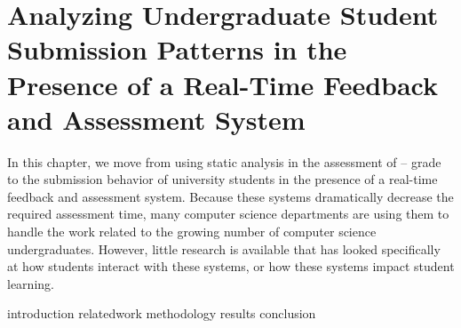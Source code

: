 \chapter{Analyzing Undergraduate Student Submission Patterns in the Presence of
  a Real-Time Feedback and Assessment System}
\label{chap:feedback}

\def\currentprefix{feedback}

In this chapter, we move from using static analysis in the assessment of
-- grade  to the submission behavior of university
students in the presence of a real-time feedback and assessment system. Because
these systems dramatically decrease the required assessment time, many computer
science departments are using them to handle the work related to the growing
number of computer science undergraduates. However, little research is
available that has looked specifically at how students interact with these
systems, or how these systems impact student learning.

\iffull
{introduction}
{relatedwork}
{methodology}
{results}
{conclusion}
\fi
